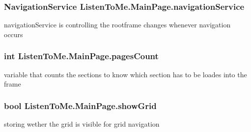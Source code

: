 \subsubsection[{\texorpdfstring{navigation\+Service}{navigationService}}]{\setlength{\rightskip}{0pt plus 5cm}Navigation\+Service Listen\+To\+Me.\+Main\+Page.\+navigation\+Service\hspace{0.3cm}{\ttfamily [private]}}\hypertarget{class_listen_to_me_1_1_main_page_aff60f67b7f65b20f4df33be26d015bcf}{}\label{class_listen_to_me_1_1_main_page_aff60f67b7f65b20f4df33be26d015bcf}


navigation\+Service is controlling the rootframe changes whenever navigation occurs 

\subsubsection[{\texorpdfstring{pages\+Count}{pagesCount}}]{\setlength{\rightskip}{0pt plus 5cm}int Listen\+To\+Me.\+Main\+Page.\+pages\+Count\hspace{0.3cm}{\ttfamily [private]}}\hypertarget{class_listen_to_me_1_1_main_page_afa885f51f46e84b050d0874e64389880}{}\label{class_listen_to_me_1_1_main_page_afa885f51f46e84b050d0874e64389880}


variable that counts the sections to know which section has to be loades into the frame 

\subsubsection[{\texorpdfstring{show\+Grid}{showGrid}}]{\setlength{\rightskip}{0pt plus 5cm}bool Listen\+To\+Me.\+Main\+Page.\+show\+Grid}\hypertarget{class_listen_to_me_1_1_main_page_a03679610fded2c61480540ebcc7e4667}{}\label{class_listen_to_me_1_1_main_page_a03679610fded2c61480540ebcc7e4667}


storing wether the grid is visible for grid navigation 

